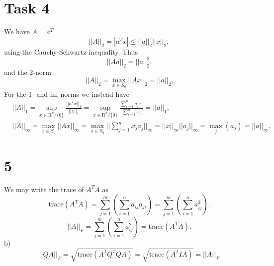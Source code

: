 \documentclass{article}
\begin{document}
\section*{Task 4}
We have $A = a^T$ 
\begin{equation}
    ||A||_2 = | a^T x| \leq ||a||_2 ||x||_2,
\end{equation}
using the Cauchy-Schwartz inequality. Thus
\begin{equation}
    ||Aa||_2 = ||a||_2^2.
\end{equation}
and the 2-norm
\begin{equation}
    ||A||_2 =  \max_{x \in S_q} ||Ax||_2 = ||a||_2.
\end{equation}
For the 1- and inf-norms we instead have
\begin{align}
& ||A||_1 = 
\sup_{x \in \mathrm{R}^n / \{ 0 \} } \frac{||a^T x||_1}{||x||_1} =
\sup_{x \in \mathrm{R}^n / \{ 0 \} } \frac{\sum_{i=1}^n a_i x_i}{\sum_{i=1}^n x_i} = ||a||_1, \\ 
& ||A||_\infty = 
\max_{x \in S_q} ||Ax||_\infty = 
\max_{x \in S_q} || \sum_{j=1}^n x_j a_j ||_\infty = 
||x||_\infty ||a_j||_\infty = \max_j (a_j) = ||a||_\infty.
\end{align}
\section*{5}
We may write the trace of $A^T A$ as
\begin{equation}
    \text{trace}(A^T A) = \sum_{j=1}^m (\sum_{i=1}^n a_{ij} a_{ji}) =  
    \sum_{j=1}^m (\sum_{i=1}^n a_{ij}^2 ).
\end{equation}
\begin{equation}
    ||A||_F = \sum_{j=1}^m (\sum_{i=1}^n a_{ij}^2 ) = \text{trace}(A^T A).
\end{equation}
b)
\begin{equation}
    ||QA||_F = \sqrt{\text{trace}(A^TQ^T Q A)} = 
               \sqrt{\text{trace}(A^T I A)}    =
               ||A||_F
                
\end{equation}
\end{document}
